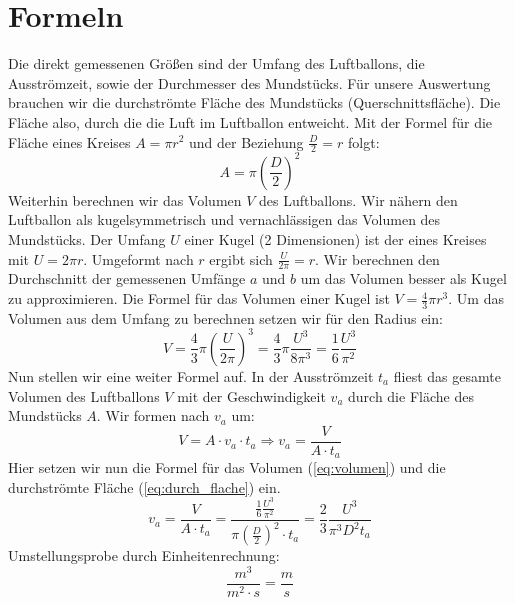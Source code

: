 \documentclass{article}
\begin{document}
    \section{Formeln}
    Die direkt gemessenen Größen sind der Umfang des Luftballons, die Ausströmzeit, sowie der Durchmesser des Mundstücks.
    Für unsere Auswertung brauchen wir die durchströmte Fläche des Mundstücks (Querschnittsfläche).
    Die Fläche also, durch die die Luft im Luftballon entweicht.
    Mit der Formel für die Fläche eines Kreises \( A = \pi {r}^2 \) und der Beziehung \( \frac{D}{2} = r\) folgt:
    \begin{equation} \label{eq:durch_flache}
        A = \pi {\left( \frac{D}{2} \right)}^2
    \end{equation}
    Weiterhin berechnen wir das Volumen \(V\) des Luftballons.
    Wir nähern den Luftballon als kugelsymmetrisch und vernachlässigen das Volumen des Mundstücks.
    Der Umfang \(U\) einer Kugel (2 Dimensionen) ist der eines Kreises mit \(U = 2 \pi r\). Umgeformt nach \(r\) ergibt sich \(\frac{U}{2 \pi} = r\).
    Wir berechnen den Durchschnitt der gemessenen Umfänge \(a\) und \(b\) um das Volumen besser als Kugel zu approximieren.
    Die Formel für das Volumen einer Kugel ist \( V = \frac{4}{3} \pi r^3 \).
    Um das Volumen aus dem Umfang zu berechnen setzen wir für den Radius ein:
    \begin{equation} \label{eq:volumen}
        V = \frac{4}{3} \pi {\left( \frac{U}{2 \pi} \right) }^3 = \frac{4}{3} \pi \frac{U^3}{8 \pi^3} = \frac{1}{6} \frac{U^3}{\pi^2}
    \end{equation}
    Nun stellen wir eine weiter Formel auf. In der Ausströmzeit \(t_a\) fliest das gesamte Volumen des Luftballons \(V\)
    mit der Geschwindigkeit \(v_a\) durch die Fläche des Mundstücks \(A\). Wir formen nach \(v_a\) um:
    \begin{equation} \label{eq:geschw_zeit_beziehung}
        V = A \cdot v_a \cdot t_a \Rightarrow v_a = \frac{V}{A \cdot t_a}
    \end{equation}
    Hier setzen wir nun die Formel für das Volumen (\ref{eq:volumen}) und die durchströmte Fläche (\ref{eq:durch_flache}) ein.
    \begin{equation} \label{eq:calc_velocity}
        v_a = \frac{V}{A \cdot t_a} = \frac{\frac{1}{6} \frac{U^3}{\pi^2} }{ \pi {\left(\frac{D}{2}\right)}^2 \cdot t_a} = \frac{2}{3} \frac{U^3}{\pi^3 D^2 t_a}
    \end{equation}
    Umstellungsprobe durch Einheitenrechnung:
    \begin{equation*}
        \unit{\frac{m^3}{m^2 \cdot s}} = \unit{\frac{m}{s}}
    \end{equation*}
\end{document}
